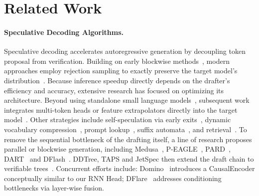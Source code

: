 \section{Related Work}
\label{sec:related_work}

\paragraph{Speculative Decoding Algorithms.}
Speculative decoding accelerates autoregressive generation by decoupling token proposal from verification. Building on early blockwise methods~\citep{stern2018blockwiseparalleldecodingdeep,sun-etal-2021-instantaneous,ge2022lossless,xia2023speculativedecodingexploitingspeculative}, modern approaches employ rejection sampling to exactly preserve the target model's distribution~\citep{chen2023accelerating,pmlr-v202-leviathan23a}. Because inference speedup directly depends on the drafter's efficiency and accuracy, extensive research has focused on optimizing its architecture. Beyond using standalone small language models~\citep{chen2023accelerating,pmlr-v202-leviathan23a}, subsequent work integrates multi-token heads or feature extrapolators directly into the target model~\citep{pmlr-v235-cai24b,ankner2024hydrasequentiallydependentdraftheads,pmlr-v235-li24bt,li-etal-2024-eagle,li2026eagle,zhang2025learningharmonizedrepresentationsspeculative,pmlr-v235-gloeckle24a,liu2024deepseek,cai2025fastmtpacceleratingllminference,eldenk2026attentiondriftautoregressivespeculative}. Other strategies include self-speculation via early exits~\citep{Zhang_2024,Elhoushi_2024,NEURIPS2024_16336d94,xia2025swiftontheflyselfspeculativedecoding}, dynamic vocabulary compression~\citep{zhao2025fr,williams2026speculative}, prompt lookup~\citep{saxena2023prompt,somasundaram2024pldacceleratingllminference}, suffix automata~\citep{hu2024samdecodingspeculativedecoding}, and retrieval~\citep{he2023rest,shen2026draftlessretrievemore}.
To remove the sequential bottleneck of the drafting itself, a line of research proposes parallel or blockwise generation, including Medusa~\citep{pmlr-v235-cai24b}, P-EAGLE~\citep{hui2026peagleparalleldraftingeaglescalable}, PARD~\citep{an2026pard,an2026pard2}, DART~\citep{liu2026dartdiffusioninspiredspeculativedecoding} and DFlash~\citep{chen2026dflash}.
DDTree, TAPS and JetSpec then extend the draft chain to verifiable trees~\citep{ringel2026ddtree,wang2026tapstargetawareprefixtree,hu2026jetspecbreakingscalingceiling}. 
Concurrent efforts include: Domino~\citep{huang2026dominodecouplingcausalmodeling} introduces a CausalEncoder conceptually similar to our RNN Head; DFlare~\citep{zhang2026dflarescalingdraftcapacity} addresses conditioning bottlenecks via layer-wise fusion.

